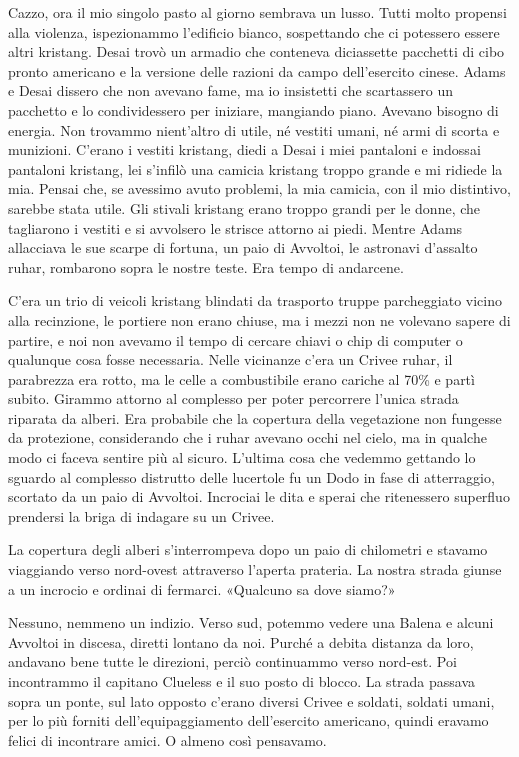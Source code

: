 Cazzo, ora il mio singolo pasto al giorno sembrava un lusso. Tutti molto
propensi alla violenza, ispezionammo l'edificio bianco, sospettando che
ci potessero essere altri kristang. Desai trovò un armadio che conteneva
diciassette pacchetti di cibo pronto americano e la versione delle
razioni da campo dell'esercito cinese. Adams e Desai dissero che non
avevano fame, ma io insistetti che scartassero un pacchetto e lo
condividessero per iniziare, mangiando piano. Avevano bisogno di
energia. Non trovammo nient'altro di utile, né vestiti umani, né armi di
scorta e munizioni. C'erano i vestiti kristang, diedi a Desai i miei
pantaloni e indossai pantaloni kristang, lei s'infilò una camicia
kristang troppo grande e mi ridiede la mia. Pensai che, se avessimo
avuto problemi, la mia camicia, con il mio distintivo, sarebbe stata
utile. Gli stivali kristang erano troppo grandi per le donne, che
tagliarono i vestiti e si avvolsero le strisce attorno ai piedi. Mentre
Adams allacciava le sue scarpe di fortuna, un paio di Avvoltoi, le
astronavi d'assalto ruhar, rombarono sopra le nostre teste. Era tempo di
andarcene.

C'era un trio di veicoli kristang blindati da trasporto truppe
parcheggiato vicino alla recinzione, le portiere non erano chiuse, ma i
mezzi non ne volevano sapere di partire, e noi non avevamo il tempo di
cercare chiavi o chip di computer o qualunque cosa fosse necessaria.
Nelle vicinanze c'era un Crivee ruhar, il parabrezza era rotto, ma le
celle a combustibile erano cariche al 70\% e partì subito. Girammo
attorno al complesso per poter percorrere l'unica strada riparata da
alberi. Era probabile che la copertura della vegetazione non fungesse da
protezione, considerando che i ruhar avevano occhi nel cielo, ma in
qualche modo ci faceva sentire più al sicuro. L'ultima cosa che vedemmo
gettando lo sguardo al complesso distrutto delle lucertole fu un Dodo in
fase di atterraggio, scortato da un paio di Avvoltoi. Incrociai le dita
e sperai che ritenessero superfluo prendersi la briga di indagare su un
Crivee.

La copertura degli alberi s'interrompeva dopo un paio di chilometri e
stavamo viaggiando verso nord-ovest attraverso l'aperta prateria. La
nostra strada giunse a un incrocio e ordinai di fermarci. «Qualcuno sa
dove siamo?»

Nessuno, nemmeno un indizio. Verso sud, potemmo vedere una Balena e
alcuni Avvoltoi in discesa, diretti lontano da noi. Purché a debita
distanza da loro, andavano bene tutte le direzioni, perciò continuammo
verso nord-est. Poi incontrammo il capitano Clueless e il suo posto di
blocco. La strada passava sopra un ponte, sul lato opposto c'erano
diversi Crivee e soldati, soldati umani, per lo più forniti
dell'equipaggiamento dell'esercito americano, quindi eravamo felici di
incontrare amici. O almeno così pensavamo.

